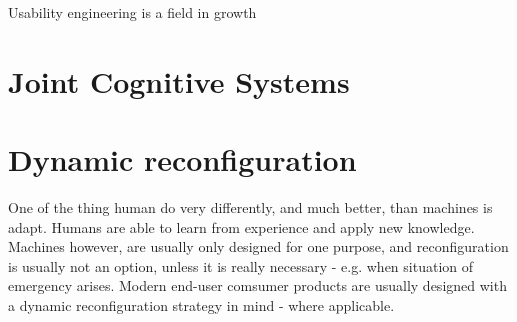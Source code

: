 Usability engineering is a field in growth

\section{Joint Cognitive Systems}
\cite{hollnagel1983cognitive}


\section{Dynamic reconfiguration}
One of the thing human do very differently, and much better, than machines is adapt. Humans are able to learn from experience and apply new knowledge. Machines however, are usually only designed for one purpose, and reconfiguration is usually not an option, unless it is really necessary - e.g. when situation of emergency arises.
Modern end-user comsumer products are usually designed with a dynamic reconfiguration strategy in mind - where applicable.


